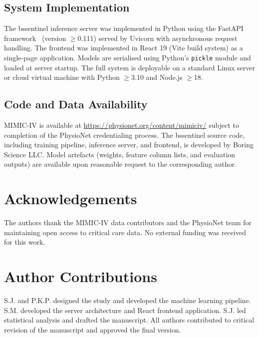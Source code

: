 \documentclass[12pt]{article}
\begin{document}
\subsection*{System Implementation}

The bssentinel inference server was implemented in Python using the FastAPI
framework~\cite{fastapi} (version $\geq$0.111) served by Uvicorn with
asynchronous request handling. The frontend was implemented in React 19
(Vite build system) as a single-page application. Models are serialised
using Python's \texttt{pickle} module and loaded at server startup. The full
system is deployable on a standard Linux server or cloud virtual machine with
Python $\geq$3.10 and Node.js $\geq$18.

\subsection*{Code and Data Availability}

MIMIC-IV is available at \url{https://physionet.org/content/mimiciv/} subject
to completion of the PhysioNet credentialing process. The bssentinel source
code, including training pipeline, inference server, and frontend, is developed
by Boring Science LLC. Model artefacts (weights, feature column lists, and
evaluation outputs) are available upon reasonable request to the corresponding
author.

\section*{Acknowledgements}

The authors thank the MIMIC-IV data contributors and the PhysioNet team for
maintaining open access to critical care data. No external funding was received
for this work.

\section*{Author Contributions}

S.J. and P.K.P. designed the study and developed the machine learning pipeline.
S.M. developed the server architecture and React frontend application.
S.J. led statistical analysis and drafted the manuscript. All authors
contributed to critical revision of the manuscript and approved the final version.
\end{document}
